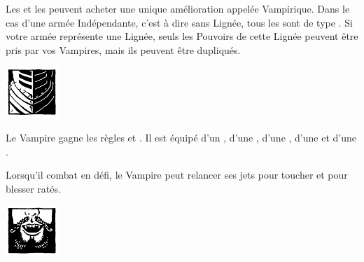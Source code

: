 \newpage
{}

\spaceaftersection{}

Les \vampirelords{} et les \vampireheroes{} peuvent acheter une unique amélioration appelée \bloodpower{} Vampirique. Dans le cas d'une armée Indépendante, c'est à dire sans Lignée, tous les \bloodpowers{} sont de type \oneofakind{}. Si votre armée représente une Lignée, seuls les Pouvoirs de cette Lignée peuvent être pris par vos Vampires, mais ils peuvent être dupliqués.

\begin{multicols}{2}\raggedcolumns

\begin{center}\includegraphics[width=2cm]{pics/logo_brotherhood.png}\end{center}
\vspace*{-1.5cm}

\vspace*{-0.2cm}
\startpricelist

 Le Vampire gagne les règles \weaponmaster{} et . Il est équipé d'un \shield{}, d'une \gw{}, d'une \halberd{}, d'une \lance{} et d'une \pw{}.

 Lorsqu'il combat en défi, le Vampire peut relancer ses jets pour toucher et pour blesser ratés.

\endpricelist

\begin{center}\includegraphics[width=2cm]{pics/logo_vonkarnstein.png}\end{center}
\vspace*{-1.5cm}


\end{multicols}
